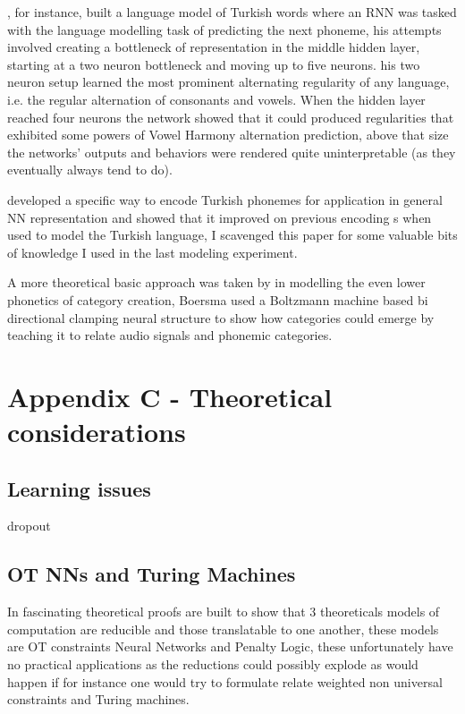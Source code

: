 \documentclass[a4paper,12pt]{article}
\begin{document}
\cite{rodd_recurrent_1997}, for instance, built a language model of Turkish words where an RNN was
tasked with the language modelling task of predicting the next phoneme, his attempts involved
creating a bottleneck of representation in the middle hidden layer, starting at a two neuron
bottleneck and moving up to five neurons. his two neuron setup learned the most prominent
alternating regularity of any language, i.e. the regular alternation of consonants and vowels. When
the hidden layer reached four neurons the network showed that it could produced regularities that
exhibited some powers of Vowel Harmony alternation prediction, above that size the networks' outputs
and behaviors were rendered quite uninterpretable (as they eventually always tend to do).

\cite{stachowski_phonological_2015} developed a specific way to encode Turkish phonemes for
application in general NN representation and showed that it improved on previous encoding s when
used to model the Turkish language, I scavenged this paper for some valuable bits of knowledge I used in
the last modeling experiment.

A more theoretical basic approach was taken by \cite{boersma_neural_2013} in modelling the even
lower phonetics of category creation, Boersma used a Boltzmann machine based bi directional
clamping neural structure to show how categories could emerge by teaching it to relate audio
signals and phonemic categories.

\iffalse

\section {Appendix C - Theoretical considerations}

\subsection{Learning issues}

dropout

\subsection{OT NNs and Turing Machines}

In \cite{blutner_neural_2009} fascinating theoretical proofs are built to show that 3 theoreticals
models of computation are reducible and those translatable to one another, these models are OT
constraints Neural Networks and Penalty Logic, these unfortunately have no practical applications as
the reductions could possibly explode as would happen if for instance one would try to formulate
relate weighted non universal constraints and Turing machines.
\end{document}
